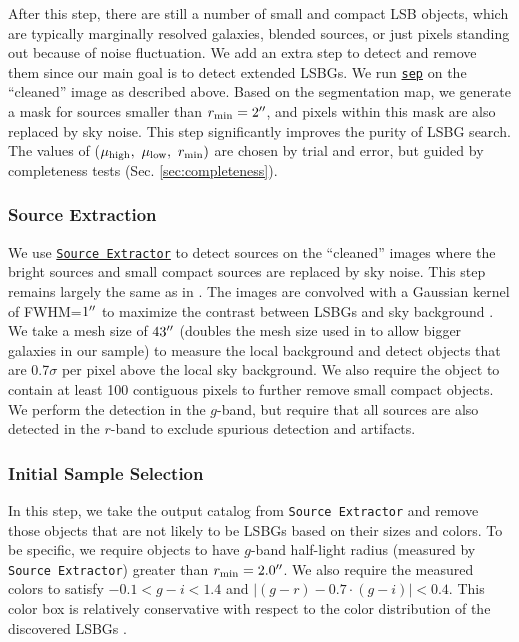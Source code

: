 \documentclass[twocolumn,astrosymb,twocolappendix]{aastex631}
\newcommand{\code}[1]{\texttt{#1}}
\begin{document}
\begin{CJK*}{UTF8}{gbsn}
    After this step, there are still a number of small and compact LSB objects, which are typically marginally resolved galaxies, blended sources, or just pixels standing out because of noise fluctuation. We add an extra step to detect and remove them since our main goal is to detect extended LSBGs. We run \href{https://sep.readthedocs.io/en/v1.1.x}{\code{sep}} \citep{Barbary2016} on the ``cleaned'' image as described above. Based on the segmentation map, we generate a mask for sources smaller than $r_{\rm min} = 2\mbox{$^{\prime\prime}$}$, and pixels within this mask are also replaced by sky noise. This step significantly improves the purity of LSBG search. The values of ($\mu_{\rm high},\ \mu_{\rm low},\ r_{\rm min})$ are chosen by trial and error, but guided by completeness tests (Sec. \ref{sec:completeness}). 
    
\subsubsection{Source Extraction}
We use \href{https://www.astromatic.net/software/sextractor/}{\code{Source Extractor}} \citep{Bertin1996} to detect sources on the ``cleaned'' images where the bright sources and small compact sources are replaced by sky noise. This step remains largely the same as in . The images are convolved with a Gaussian kernel of FWHM=$1\mbox{$^{\prime\prime}$}$ to maximize the contrast between LSBGs and sky background \citep[e.g.,][]{Irwin1985,Akhlaghi2015,Greco2018}. We take a mesh size of $43\mbox{$^{\prime\prime}$}$ (doubles the mesh size used in  to allow bigger galaxies in our sample) to measure the local background and detect objects that are 0.7$\sigma$ per pixel above the local sky background. We also require the object to contain at least 100 contiguous pixels to further remove small compact objects. We perform the detection in the $g$-band, but require that all sources are also detected in the $r$-band to exclude spurious detection and artifacts.
    
\subsubsection{Initial Sample Selection} 
In this step, we take the output catalog from \code{Source Extractor} and remove those objects that are not likely to be LSBGs based on their sizes and colors. To be specific, we require objects to have $g$-band half-light radius (measured by \code{Source Extractor}) greater than $r_{\rm min} = 2.0\mbox{$^{\prime\prime}$}$. We also require the measured colors to satisfy $-0.1 < g-i < 1.4$ and $|(g-r) - 0.7\cdot (g-i)| < 0.4$. This color box is relatively conservative with respect to the color distribution of the discovered LSBGs \citep[e.g.,][]{Greco2018,Zaritsky2019,Tanoglidis2021,SAGA-I}. 


\end{CJK*}
\end{document}
